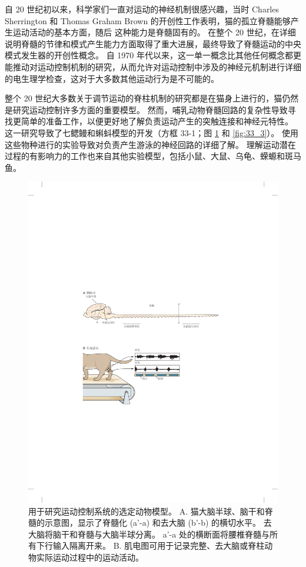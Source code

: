 自 20 世纪初以来，科学家们一直对运动的神经机制很感兴趣，当时 Charles Sherrington 和 Thomas Graham Brown 的开创性工作表明，猫的孤立脊髓能够产生运动活动的基本方面，随后 这种能力是脊髓固有的。 在整个 20 世纪，在详细说明脊髓的节律和模式产生能力方面取得了重大进展，最终导致了脊髓运动的中央模式发生器的开创性概念。 自 1970 年代以来，这一单一概念比其他任何概念都更能推动对运动控制机制的研究，从而允许对运动控制中涉及的神经元机制进行详细的电生理学检查，这对于大多数其他运动行为是不可能的。

整个 20 世纪大多数关于调节运动的脊柱机制的研究都是在猫身上进行的，猫仍然是研究运动控制许多方面的重要模型。 
然而，哺乳动物脊髓回路的复杂性导致寻找更简单的准备工作，以便更好地了解负责运动产生的突触连接和神经元特性。 
这一研究导致了七鳃鳗和蝌蚪模型的开发（方框 33-1；图 \ref{fig:33_2} 和 \ref{fig:33_3}）。 
使用这些物种进行的实验导致对负责产生游泳的神经回路的详细了解。 理解运动潜在过程的有影响力的工作也来自其他实验模型，包括小鼠、大鼠、乌龟、蝾螈和斑马鱼。

\begin{figure}[htbp]
	\centering
	\includegraphics[width=0.7\linewidth]{chap33/fig_33_2}
	\caption{用于研究运动控制系统的选定动物模型。 A. 猫大脑半球、脑干和脊髓的示意图，显示了脊髓化 (a'-a) 和去大脑 (b'-b) 的横切水平。 去大脑将脑干和脊髓与大脑半球分离。 a'-a 处的横断面将腰椎脊髓与所有下行输入隔离开来。 B. 肌电图可用于记录完整、去大脑或脊柱动物实际运动过程中的运动活动。}
	\label{fig:33_2}
\end{figure}

